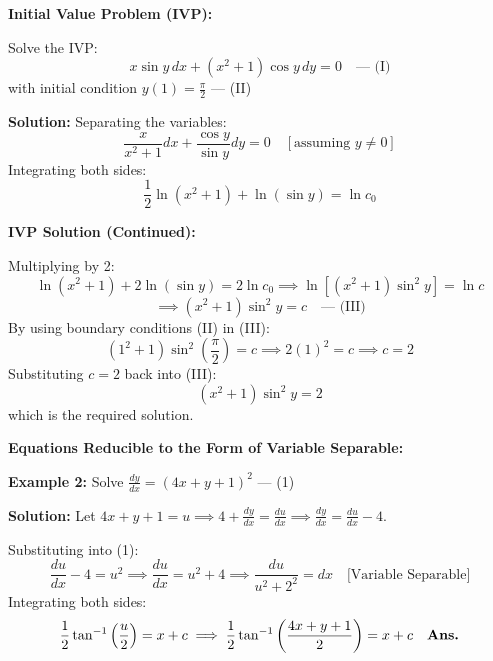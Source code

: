 \documentclass[11pt,a4paper]{article}
\newcommand{\Heading}[1]{\vspace{0.3cm}\noindent\textbf{\textcolor{AcademicGreen}{\large #1}}\par\vspace{0.15cm}}
\begin{document}
\vspace{0.3cm}
\Heading{Initial Value Problem (IVP):}
Solve the IVP:
\begin{equation}
    x \sin y \, dx + (x^2 + 1)\cos y \, dy = 0 \quad \text{--- (I)} \label{eq:p1_ivp}
\end{equation}
with initial condition $y(1) = \frac{\pi}{2}$ \quad --- (II)

\vspace{0.15cm}
\noindent\textbf{Solution:} Separating the variables:
\[
\frac{x}{x^2 + 1} dx + \frac{\cos y}{\sin y} dy = 0 \quad [\text{assuming } y \neq 0]
\]
Integrating both sides:
\[
\frac{1}{2}\ln(x^2 + 1) + \ln(\sin y) = \ln c_0
\]

\newpage

\Heading{IVP Solution (Continued):}
Multiplying by 2:
\[
\ln(x^2 + 1) + 2\ln(\sin y) = 2\ln c_0 \implies \ln\left[(x^2 + 1)\sin^2 y\right] = \ln c
\]
\[
\implies (x^2 + 1)\sin^2 y = c \quad \text{--- (III)}
\]
By using boundary conditions (II) in (III):
\[
(1^2 + 1)\sin^2\left(\frac{\pi}{2}\right) = c \implies 2(1)^2 = c \implies c = 2
\]
Substituting $c = 2$ back into (III):
\[
(x^2 + 1)\sin^2 y = 2
\]
which is the required solution.

\vspace{0.4cm}
\Heading{Equations Reducible to the Form of Variable Separable:}

\begin{tcolorbox}[greenbox]
    \textbf{\textcolor{AcademicGreen}{Example 2:}} Solve $\frac{dy}{dx} = (4x + y + 1)^2$ \quad --- (1)
    
    \vspace{0.2cm}
    \noindent\textbf{Solution:} Let $4x + y + 1 = u \implies 4 + \frac{dy}{dx} = \frac{du}{dx} \implies \frac{dy}{dx} = \frac{du}{dx} - 4$.
    
    \noindent Substituting into (1):
    \[
    \frac{du}{dx} - 4 = u^2 \implies \frac{du}{dx} = u^2 + 4 \implies \frac{du}{u^2 + 2^2} = dx \quad \text{[Variable Separable]}
    \]
    Integrating both sides:
    \[
    \frac{1}{2}\tan^{-1}\left(\frac{u}{2}\right) = x + c \implies \frac{1}{2}\tan^{-1}\left(\frac{4x + y + 1}{2}\right) = x + c \quad \text{\textbf{Ans.}}
    \]
\end{tcolorbox}
\end{document}
